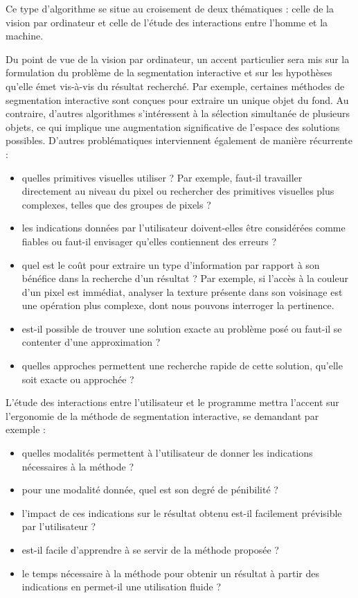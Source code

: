 \begin{emodif}
Ce type d'algorithme se situe au croisement de deux thématiques : celle de la vision par ordinateur et celle de l'étude des interactions entre l'homme et la machine. 

Du point de vue de la vision par ordinateur, un accent particulier sera mis sur la formulation du problème de la segmentation interactive et sur les hypothèses qu'elle émet vis-à-vis du résultat recherché. Par exemple, certaines méthodes de segmentation interactive sont conçues pour extraire un unique objet du fond. Au contraire, d'autres algorithmes s'intéressent à la sélection simultanée de plusieurs objets, ce qui implique une augmentation significative de l'espace des solutions possibles. D'autres problématiques interviennent également de manière récurrente :  
\begin{itemize}
\item quelles primitives visuelles utiliser ? Par exemple, faut-il travailler directement au niveau du pixel ou rechercher des primitives visuelles plus complexes, telles que des groupes de pixels ? 
\item les indications données par l'utilisateur doivent-elles être considérées comme fiables ou faut-il envisager qu'elles contiennent des erreurs ? 
\item quel est le coût pour extraire un type d'information par rapport à son bénéfice dans la recherche d'un résultat ? Par exemple, si l'accès à la couleur d'un pixel est immédiat, analyser la texture présente dans son voisinage est une opération plus complexe, dont nous pouvons interroger la pertinence. 
\item est-il possible de trouver une solution exacte au problème posé ou faut-il se contenter d'une approximation ?
\item quelles approches permettent une recherche rapide de cette solution, qu'elle soit exacte ou approchée ?
\end{itemize}

L'étude des interactions entre l'utilisateur et le programme mettra l'accent sur l'ergonomie de la méthode de segmentation interactive, se demandant par exemple :
\begin{itemize}
\item quelles modalités permettent à l'utilisateur de donner les indications nécessaires à la méthode ? 
\item pour une  modalité donnée, quel est son degré de pénibilité ?
\item l'impact de ces indications sur le résultat obtenu est-il facilement prévisible par l'utilisateur ? 
\item est-il facile d'apprendre à se servir de la méthode proposée ?
\item le temps nécessaire à la méthode pour obtenir un résultat à partir des indications en permet-il une utilisation fluide ? 
\end{itemize}


\end{emodif}

